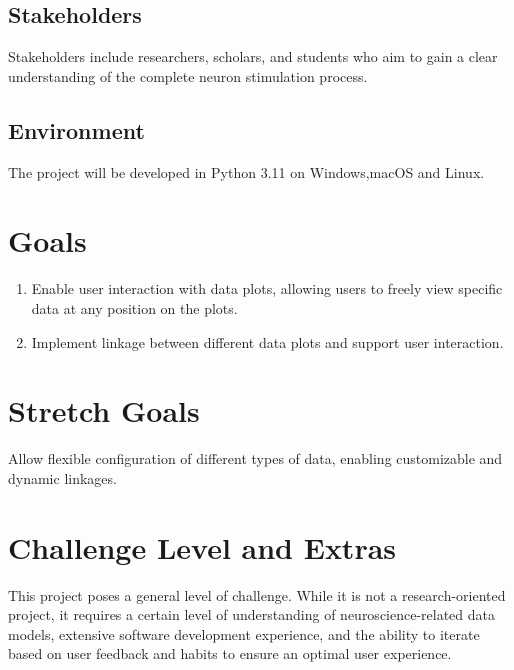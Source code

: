 \documentclass{article}
\begin{document}
\subsection{Stakeholders}
Stakeholders include researchers, scholars, and students who aim to gain a clear understanding of the complete neuron stimulation process.
\subsection{Environment}
The project will be developed in Python 3.11 on Windows,macOS and Linux.


\section{Goals}
\begin{enumerate}
    \item Enable user interaction with data plots, allowing users to freely view specific data at any position on the plots.
    \item Implement linkage between different data plots and support user interaction.
\end{enumerate}
\section{Stretch Goals}
Allow flexible configuration of different types of data, enabling customizable and dynamic linkages.
\section{Challenge Level and Extras}

This project poses a general level of challenge. While it is not a research-oriented project, it requires a certain level of understanding of neuroscience-related data models, extensive software development experience, and the ability to iterate based on user feedback and habits to ensure an optimal user experience.
\end{document}
